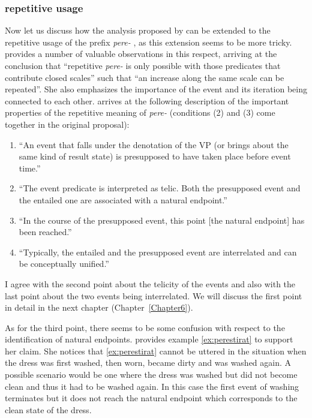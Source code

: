 \subsubsection{repetitive  usage}
Now let us discuss how the analysis proposed by \citet{Kagan:book} can be extended to the repetitive  usage of the prefix \textit{pere-}  , as this extension seems to be more tricky. \citet[149]{Kagan:book} provides a number of valuable observations in this respect, arriving at the conclusion that ``repetitive  \textit{pere-}   is only possible with those predicates that contribute closed scales''
such that ``an increase along the same scale can be repeated''. She also emphasizes the importance of the event and its iteration being connected to each other. \citet[148]{Kagan:book} arrives at the following description of the important properties of the repetitive  meaning of \textit{pere-}   (conditions (2) and (3) come together in the original proposal): 
\begin{enumerate}
\item ``An event that falls under the denotation of the VP (or brings about the same kind of result state) is presupposed to have taken place before event time.'' 
\item ``The event predicate is interpreted as telic. Both the presupposed event and the entailed one are associated with a natural endpoint.'' 
\item ``In the course of the presupposed event, this point [the natural endpoint] has been reached.''
\item ``Typically, the entailed and the presupposed event are interrelated and can be conceptually unified.''
\end{enumerate}

I agree with the second point about the telicity of the events and also with the last point about the two events being interrelated. We will discuss the first point in detail in the next chapter (Chapter~\ref{Chapter6}). 

As for the third point, there seems to be some confusion with respect to the identification of natural endpoints. \citet{Kagan:book} provides example \ref{ex:perestirat} to support her claim. She notices that \ref{ex:perestirat} cannot be uttered in the situation when the dress was first washed, then worn, became dirty and was washed again. A possible scenario would be one where the dress was washed but did not become clean and thus it had to be washed again. In this case the first event of washing terminates but it does not reach the natural endpoint which corresponds to the clean state of the dress.

